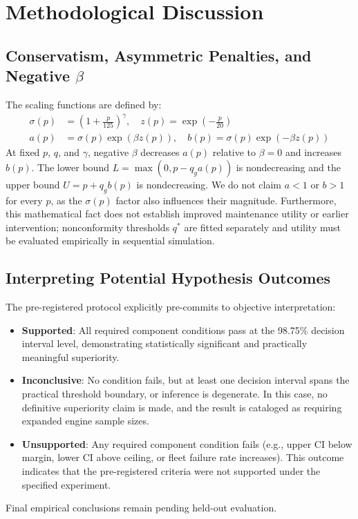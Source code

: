 \section{Methodological Discussion}
\subsection{Conservatism, Asymmetric Penalties, and Negative $\beta$}
The scaling functions are defined by:
\begin{align}
\sigma(p) &= \left(1 + \frac{p}{125}\right)^\gamma, \quad z(p) = \exp\left(-\frac{p}{20}\right) \\
a(p) &= \sigma(p)\exp(\beta z(p)), \quad b(p) = \sigma(p)\exp(-\beta z(p))
\end{align}
At fixed $p$, $q$, and $\gamma$, negative $\beta$ decreases $a(p)$ relative to $\beta=0$ and increases $b(p)$. The lower bound $L = \max(0, p - q_g a(p))$ is nondecreasing and the upper bound $U = p + q_g b(p)$ is nondecreasing. We do not claim $a < 1$ or $b > 1$ for every $p$, as the $\sigma(p)$ factor also influences their magnitude. Furthermore, this mathematical fact does not establish improved maintenance utility or earlier intervention; nonconformity thresholds $q^*$ are fitted separately and utility must be evaluated empirically in sequential simulation.

\subsection{Interpreting Potential Hypothesis Outcomes}
The pre-registered protocol explicitly pre-commits to objective interpretation:
\begin{itemize}
    \item \textbf{Supported}: All required component conditions pass at the 98.75\% decision interval level, demonstrating statistically significant and practically meaningful superiority.
    \item \textbf{Inconclusive}: No condition fails, but at least one decision interval spans the practical threshold boundary, or inference is degenerate. In this case, no definitive superiority claim is made, and the result is cataloged as requiring expanded engine sample sizes.
    \item \textbf{Unsupported}: Any required component condition fails (e.g., upper CI below margin, lower CI above ceiling, or fleet failure rate increases). This outcome indicates that the pre-registered criteria were not supported under the specified experiment.
\end{itemize}
Final empirical conclusions remain pending held-out evaluation.

